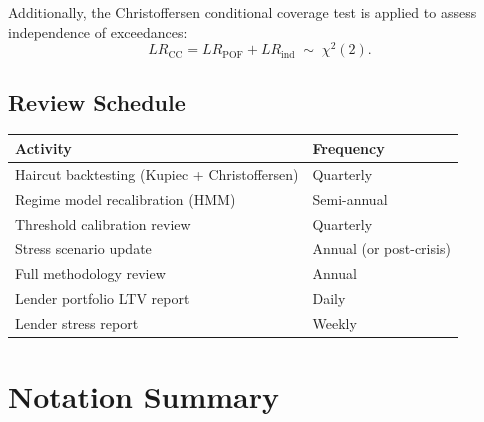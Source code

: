 \documentclass[12pt, a4paper]{article}
\newcommand{\1}{\mathbbm{1}}
\begin{document}
Additionally, the Christoffersen conditional coverage test is applied to assess
independence of exceedances:
\[
LR_{\mathrm{CC}} = LR_{\mathrm{POF}} + LR_{\mathrm{ind}} \;\sim\; \chi^2(2).
\]

\subsection{Review Schedule}

\begin{table}[H]
\centering
\begin{tabular}{ll}
\toprule
\textbf{Activity} & \textbf{Frequency} \\
\midrule
Haircut backtesting (Kupiec + Christoffersen) & Quarterly \\
Regime model recalibration (HMM)             & Semi-annual \\
Threshold calibration review                 & Quarterly \\
Stress scenario update                       & Annual (or post-crisis) \\
Full methodology review                      & Annual \\
Lender portfolio LTV report                  & Daily \\
Lender stress report                         & Weekly \\
\bottomrule
\end{tabular}
\end{table}

\appendix

\section{Notation Summary}
\label{app:notation}
\end{document}
